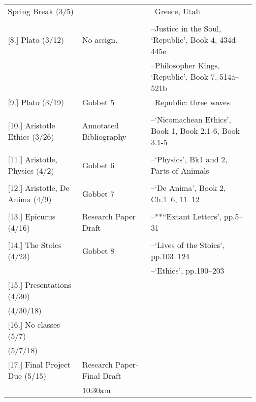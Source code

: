\documentclass[article,oneside]{memoir}
\begin{document}
\begin{center}
\begin{longtable}{p{4.5cm}p{2cm}p{6cm}}
Spring Break (3/5)				& 				 & --Greece, Utah\\
					& 				 &   \\ [1.8\baselineskip]	

[8.] Plato	(3/12)				& No assign.		& --Justice in the Soul, `Republic', Book 4, 434d-445e\\
	            		&		      		& --Philosopher Kings, `Republic', Book 7, 514a--521b \\  [1.8\baselineskip]

[9.] Plato 	(3/19)				& Gobbet 5		& --Republic: three waves\\
		            		&		      		& \\  [1.8\baselineskip]


[10.] Aristotle Ethics	(3/26)		& Annotated Bibliography	& --`Nicomachean Ethics', Book 1, Book 2.1-6, Book 3.1-5  \\
			        & 			 &  \\ [1.8\baselineskip]


[11.] Aristotle, Physics (4/2)		& Gobbet 6		& --`Physics', Bk1 and 2, Parts of Animals \\ 
				      	&			      	&  \\ [1.8\baselineskip]

						
[12.] Aristotle, De Anima (4/9)	      	& Gobbet 7		&  --`De Anima', Book 2, Ch.1--6, 11--12 \\
				      	&			      	&  \\  [1.8\baselineskip]

						 
[13.] Epicurus (4/16)	    			& Research Paper Draft		& --**``Extant Letters', pp.5--31\\
			      		&			      	&  \\ [1.8\baselineskip]

[14.] The Stoics	(4/23)		  	& Gobbet 8		&--`Lives of the Stoics', pp.103--124 \\ 
			      	&		      		& --`Ethics', pp.190--203 \\[1.8\baselineskip]

[15.] Presentations (4/30)			& 				& \\ 
(4/30/18)				      	&			       	& \\ [1.8\baselineskip]

[16.] No classes (5/7)		    	& 				& \\ 
(5/7/18)				      	& 			     	 & \\ [1.8\baselineskip]

[17.] Final Project Due (5/15)		    		& Research Paper-Final Draft	& \\ 
				      	&  10:30am      & \\

\end{longtable}
\end{center}



\end{document}
